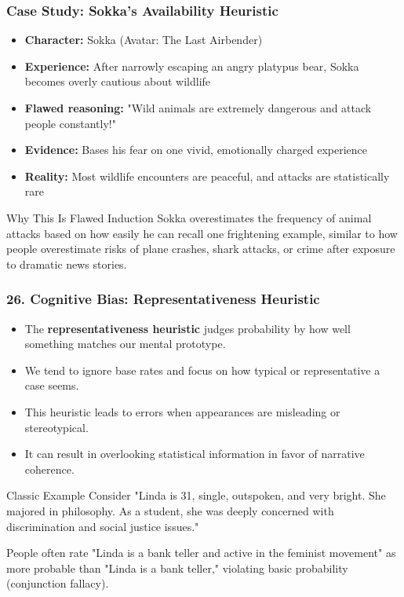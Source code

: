 \documentclass{beamer}
\begin{document}
\begin{frame}
    \frametitle{Case Study: Sokka's Availability Heuristic}
    
    \begin{itemize}
    \item \textbf{Character:} Sokka (Avatar: The Last Airbender)
    \item \textbf{Experience:} After narrowly escaping an angry platypus bear, Sokka becomes overly cautious about wildlife
    \item \textbf{Flawed reasoning:} "Wild animals are extremely dangerous and attack people constantly!"
    \item \textbf{Evidence:} Bases his fear on one vivid, emotionally charged experience
    \item \textbf{Reality:} Most wildlife encounters are peaceful, and attacks are statistically rare
    \end{itemize}
    
    \begin{alertblock}{Why This Is Flawed Induction}
    Sokka overestimates the frequency of animal attacks based on how easily he can recall one frightening example, similar to how people overestimate risks of plane crashes, shark attacks, or crime after exposure to dramatic news stories.
    \end{alertblock}
    \end{frame}

\begin{frame}
\frametitle{26. Cognitive Bias: Representativeness Heuristic}
\begin{itemize}
\item The \textbf{representativeness heuristic} judges probability by how well something matches our mental prototype.
\item We tend to ignore base rates and focus on how typical or representative a case seems.
\item This heuristic leads to errors when appearances are misleading or stereotypical.
\item It can result in overlooking statistical information in favor of narrative coherence.
\end{itemize}

\begin{alertblock}{Classic Example}
Consider "Linda is 31, single, outspoken, and very bright. She majored in philosophy. As a student, she was deeply concerned with discrimination and social justice issues."

People often rate "Linda is a bank teller and active in the feminist movement" as more probable than "Linda is a bank teller," violating basic probability (conjunction fallacy).
\end{alertblock}
\end{frame}
\end{document}
